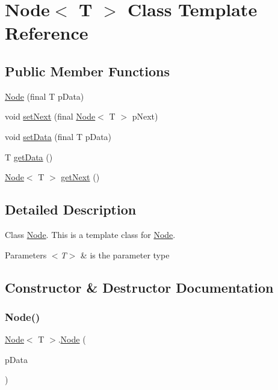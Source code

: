 \hypertarget{class_node}{}\section{Node$<$ T $>$ Class Template Reference}
\label{class_node}
\subsection*{Public Member Functions}
\begin{DoxyCompactItemize}
\item 
\mbox{\hyperlink{class_node_a692c4af3a3274febfa32e5cb9b8b109d}{Node}} (final T p\+Data)
\item 
void \mbox{\hyperlink{class_node_a3fe482188599b86b0a11239a47a88443}{set\+Next}} (final \mbox{\hyperlink{class_node}{Node}}$<$ T $>$ p\+Next)
\item 
void \mbox{\hyperlink{class_node_ad5da4ea9b4329014fa04989d77aa8fab}{set\+Data}} (final T p\+Data)
\item 
T \mbox{\hyperlink{class_node_ab2b3d985988d010de2e125417c04d063}{get\+Data}} ()
\item 
\mbox{\hyperlink{class_node}{Node}}$<$ T $>$ \mbox{\hyperlink{class_node_a2ec63a299666383d35bdde247fb7fb67}{get\+Next}} ()
\end{DoxyCompactItemize}


\subsection{Detailed Description}
Class \mbox{\hyperlink{class_node}{Node}}. This is a template class for \mbox{\hyperlink{class_node}{Node}}.


\begin{DoxyParams}{Parameters}
{\em $<$\+T$>$} & is the parameter type \\
\hline
\end{DoxyParams}


\subsection{Constructor \& Destructor Documentation}
\mbox{\label{class_node_a692c4af3a3274febfa32e5cb9b8b109d}} 
\subsubsection{\texorpdfstring{Node()}{Node()}}
{\footnotesize\ttfamily \mbox{\hyperlink{class_node}{Node}}$<$ T $>$.\mbox{\hyperlink{class_node}{Node}} (\begin{DoxyParamCaption}\item[{final T}]{p\+Data }\end{DoxyParamCaption})\hspace{0.3cm}{\ttfamily [inline]}}

